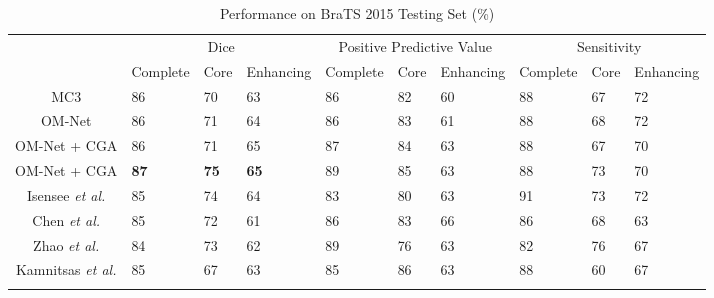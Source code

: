 \documentclass[journal,twoside]{IEEEtran}
\begin{document}
\begin{table*}
	\newcommand{\tabincell}[2]{\begin{tabular}{@{}#1@{}}#2\end{tabular}}
	\fontsize{7}{14}\selectfont
	\centering
	\caption{Performance on BraTS 2015 Testing Set  (\%) }
	
	\label{Table2}
	\begin{tabular}{c|p{1.05cm}<{\centering}|p{0.75cm}<{\centering}|p{1.15cm}<{\centering}|p{1.05cm}<{\centering}|p{0.75cm}<{\centering}|p{1.15cm}<{\centering}|p{1.05cm}<{\centering}|p{0.75cm}<{\centering}|p{1.15cm}<{\centering}}  
		\shline
		\multirow{2}{*}{Method} & \multicolumn{3}{c|}{Dice} &\multicolumn{3}{c|}{Positive Predictive Value} & \multicolumn{3}{c}{Sensitivity}\\
		\cline{2-10}
		&Complete &Core &Enhancing &Complete &Core &Enhancing &Complete &Core &Enhancing \\
		\hline
		MC3 &86 &70 &63 &86 &82 &60 &88 &67 &72\\
		\hline
		OM-Net &86 &71 &64 &86 &83 &61 &88 &68 &72\\
		\hline		
		OM-Net + CGA &86 &71 &65 &87 &84 &63 &88 &67 &70\\	
		\hline
		OM-Net + CGA &\textbf{87} &\textbf{75} &\textbf{65} &89 &85 &63 &88 &73 &70\\			
		\hline 
		\hline
		Isensee \emph{et al.} \cite{isensee2017brain} &85 &74 &64 &83 &80 &63 &91 &73 &72\\
		\hline
		Chen \emph{et al.} \cite{chen2018focus} &85 &72 &61 &86 &83 &66 &86 &68 &63\\
		\hline	
		Zhao \emph{et al.} \cite{zhao2018deep} &84 &73 &62 &89 &76 &63 &82 &76 &67\\
		\hline	
		Kamnitsas \emph{et al.} \cite{kamnitsas2017efficient} &85 &67 &63 &85 &86 &63 &88 &60 &67\\
		\shline
	\end{tabular}
	
\end{table*}
\end{document}
